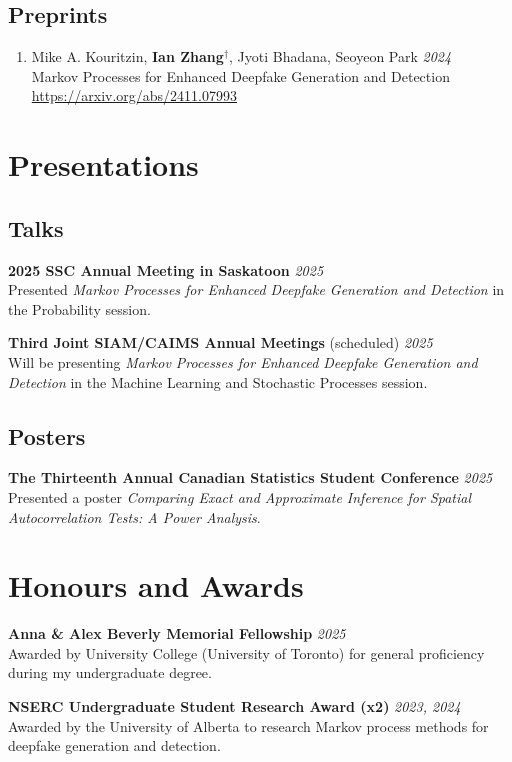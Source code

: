 \documentclass[11pt]{article}
\theoremstyle{definition}
\newcommand{\1}{\mathds 1}
\begin{document}
\subsection*{Preprints}
\begin{enumerate}
    \item Mike A. Kouritzin, \textbf{Ian Zhang}$^\dag$, Jyoti Bhadana, Seoyeon Park \hfill \textit{2024}\\
    Markov Processes for Enhanced Deepfake Generation and Detection \\
    \url{https://arxiv.org/abs/2411.07993}
\end{enumerate}

\section*{Presentations}
\subsection*{Talks}
\textbf{2025 SSC Annual Meeting in Saskatoon} \hfill \textit{2025}\\
Presented \textit{Markov Processes for Enhanced Deepfake Generation and Detection} in the Probability session.

\textbf{Third Joint SIAM/CAIMS Annual Meetings} (scheduled) \hfill \textit{2025}\\
Will be presenting \textit{Markov Processes for Enhanced Deepfake Generation and Detection} in the Machine Learning and Stochastic Processes session. 

\subsection*{Posters}
\textbf{The Thirteenth Annual Canadian Statistics Student Conference} \hfill \textit{2025}\\
Presented a poster \textit{Comparing Exact and Approximate Inference for Spatial Autocorrelation Tests: A Power Analysis}.

\section*{Honours and Awards}
\textbf{Anna \& Alex Beverly Memorial Fellowship} \hfill \textit{2025}\\
Awarded by University College (University of Toronto) for general proficiency during my undergraduate degree.

\textbf{NSERC Undergraduate Student Research Award (x2)} \hfill \textit{2023, 2024}\\
Awarded by the University of Alberta to research Markov process methods for deepfake generation and detection. 
\end{document}
